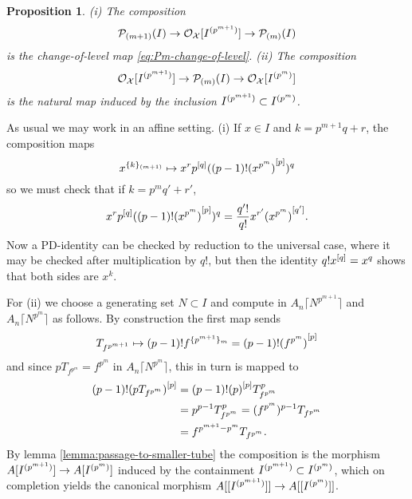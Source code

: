 \documentclass{article}
\theoremstyle{change}
\newtheorem{prop}[subsubsection]{Proposition}
\numberwithin{equation}{subsubsection}
\newcommand{\demobox}{\vrule height6pt width6pt depth0pt}
\newenvironment{demo}{\noindent{\it Proof.}}
{{\unskip\nobreak\hfil\qquad
\demobox\parfillskip=0pt\par}
\medskip}
\newcommand\lc{\lceil}
\newcommand\rc{\rceil}
\begin{document}
\begin{prop}\label{prop:tube-to-envelope-compositions}
  (i) The composition
  \begin{equation}
    {\cal P}_{(m+1)}(I)\to{\cal O}_{\cal X}[{I}^{({p^{m+1}})}]\to{\cal P}_{(m)}(I)
  \end{equation}
  is the change-of-level map \ref{eq:Pm-change-of-level}. (ii)
  The composition
  \begin{equation}
    {\cal O}_{\cal X}[{I}^{({p^{m+1}})}]\to{\cal P}_{(m)}(I)\to{\cal O}_{\cal X}[{I}^{({p^m})}]
  \end{equation}
  is the natural map induced by the inclusion
  ${I}^{({p^{m+1}})}\subset{I}^{({p^m})}$. 
\end{prop}
\begin{demo}
  As usual we may work in an affine setting. (i) If $x\in I$ and
  $k=p^{m+1}q+r$, the composition maps
  \begin{displaymath}
    {x}^{\{{k}\}_{(m+1)}}\mapsto x^r{p}^{[{q}]}((p-1)!{(x^{p^m})}^{[{p}]})^q
  \end{displaymath}
  so we must check that if $k=p^mq'+r'$,
  \begin{displaymath}
    x^r{p}^{[{q}]}((p-1)!{(x^{p^m})}^{[{p}]})^q
    =\frac{q'!}{q!}x^{r'}{(x^{p^m})}^{[{q'}]}.
  \end{displaymath}
  Now a PD-identity can be checked by reduction to the universal case,
  where it may be checked after multiplication by $q!$, but then the
  identity $q!{x}^{[{q}]}=x^q$ shows that both sides are $x^k$.

  For (ii) we choose a generating set $N\subset I$ and compute in
  $A_n\lc N^{p^{m+1}}\rc$ and $A_n\lc N^{p^m}\rc$ as follows. By
  construction the first map sends
  \begin{displaymath}
    T_{f^{p^{m+1}}}\mapsto (p-1)!{f}^{\{{p^{m+1}}\}_{m}}
    =(p-1)!{(f^{p^m})}^{[{p}]}
  \end{displaymath}
  and since $pT_{f^{p^m}}=f^{p^m}$ in $A_n\lc N^{p^m}\rc$, this in turn is
  mapped to
  \begin{align*}
    (p-1)!{(pT_{f^{p^m}})}^{[{p}]}
    &=(p-1)!{(p)}^{[{p}]}T_{f^{p^m}}^p\\
    &=p^{p-1}T_{f^{p^m}}^p=(f^{p^m})^{p-1}T_{f^{p^m}}\\
    &=f^{p^{m+1}-p^m}T_{f^{p^m}}.
  \end{align*}
  By lemma \ref{lemma:passage-to-smaller-tube} the composition is the
  morphism $A[{I}^{({p^{m+1}})}]\to A[{I}^{({p^m})}]$ induced by the
  containment ${I}^{({p^{m+1}})}\subset{I}^{({p^m})}$, which on
  completion yields the canonical morphism
  $A[[{I}^{({p^{m+1}})}]]\to A[[{I}^{({p^m})}]]$.
\end{demo}
\end{document}

